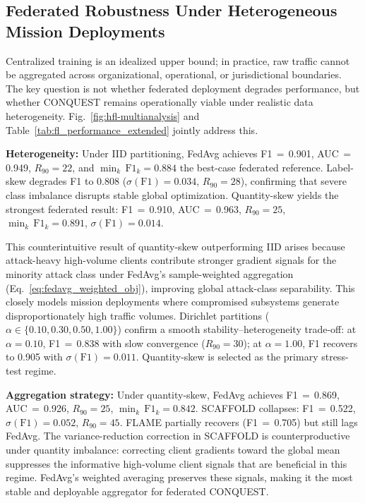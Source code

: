 \documentclass[conference]{IEEEtran}
\begin{document}
\subsection{Federated Robustness Under Heterogeneous Mission Deployments}
\label{subsec:obj3_heterogeneity}
Centralized training is an idealized upper bound; in practice,
raw traffic cannot be aggregated across organizational,
operational, or jurisdictional boundaries. The key question
is not whether federated deployment degrades performance, but
whether CONQUEST remains operationally viable under realistic
data heterogeneity. Fig.~\ref{fig:hfl-multianalysis} and
Table~\ref{tab:fl_performance_extended} jointly address this.

\textbf{Heterogeneity:}
Under IID partitioning, FedAvg achieves F1\,$=$\,0.901,
AUC\,$=$\,0.949, $R_{90}{=}22$, and
$\min_k\,\mathrm{F1}_k{=}0.884$ the best-case federated reference. Label-skew degrades F1 to 0.808
($\sigma(\mathrm{F1}){=}0.034$, $R_{90}{=}28$), confirming
that severe class imbalance disrupts stable global optimization.
Quantity-skew yields the strongest federated result:
F1\,$=$\,0.910, AUC\,$=$\,0.963, $R_{90}{=}25$,
$\min_k\,\mathrm{F1}_k{=}0.891$, $\sigma(\mathrm{F1}){=}0.014$.

This counterintuitive result of quantity-skew outperforming
IID arises because attack-heavy high-volume clients
contribute stronger gradient signals for the minority attack
class under FedAvg's sample-weighted aggregation
(Eq.~\eqref{eq:fedavg_weighted_obj}), improving global
attack-class separability. This closely models mission
deployments where compromised subsystems generate
disproportionately high traffic volumes. Dirichlet partitions
($\alpha\in\{0.10,0.30,0.50,1.00\}$) confirm a smooth
stability--heterogeneity trade-off: at $\alpha{=}0.10$,
F1\,$=$\,0.838 with slow convergence ($R_{90}{=}30$);
at $\alpha{=}1.00$, F1 recovers to 0.905 with
$\sigma(\mathrm{F1}){=}0.011$. Quantity-skew is selected
as the primary stress-test regime.

\textbf{Aggregation strategy:}
Under quantity-skew, FedAvg achieves F1\,$=$\,0.869,
AUC\,$=$\,0.926, $R_{90}{=}25$,
$\min_k\,\mathrm{F1}_k{=}0.842$. SCAFFOLD collapses:
F1\,$=$\,0.522, $\sigma(\mathrm{F1}){=}0.052$,
$R_{90}{=}45$. FLAME partially recovers (F1\,$=$\,0.705)
but still lags FedAvg. The variance-reduction correction
in SCAFFOLD is counterproductive under quantity imbalance:
correcting client gradients toward the global mean suppresses the informative high-volume client signals that are beneficial
in this regime. FedAvg's weighted averaging preserves these
signals, making it the most stable and deployable aggregator
for federated CONQUEST.
\end{document}
